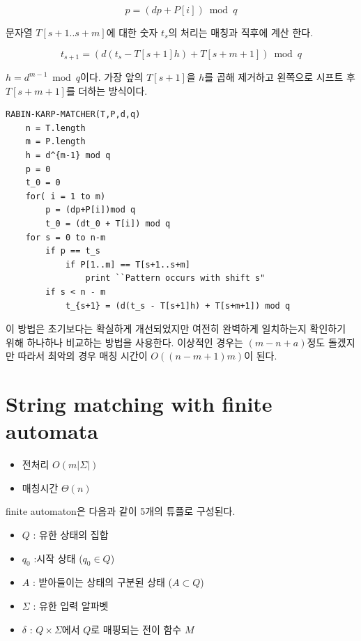 $$p = (dp+P[i]) \bmod q$$

문자열 $T[s+1..s+m]$에 대한 숫자 $t_s$의 처리는 매칭과 직후에 계산 한다.

$$t_{s+1} = (d(t_s - T[s+1]h) + T[s+m+1]) \bmod q$$

$ h = d^{m-1} \bmod q$이다. 가장 앞의 $T[s+1]$을 $h$를 곱해 제거하고 왼쪽으로 시프트 후 $T[s+m+1]$를 더하는 방식이다.



\begin{lstlisting}[style = CStyle]
RABIN-KARP-MATCHER(T,P,d,q)
    n = T.length
    m = P.length
    h = d^{m-1} mod q
    p = 0
    t_0 = 0
    for( i = 1 to m)
        p = (dp+P[i])mod q
        t_0 = (dt_0 + T[i]) mod q
    for s = 0 to n-m
        if p == t_s
            if P[1..m] == T[s+1..s+m]
                print ``Pattern occurs with shift s"
        if s < n - m
            t_{s+1} = (d(t_s - T[s+1]h) + T[s+m+1]) mod q
\end{lstlisting}

이 방법은 초기보다는 확실하게 개선되었지만 여전히 완벽하게 일치하는지 확인하기 위해 하나하나 비교하는 방법을 사용한다. 이상적인 경우는 $(m-n+a)$정도 돌겠지만  따라서 최악의 경우 매칭 시간이 $O((n-m+1)m)$이 된다.

\section{String matching with finite automata}

\begin{itemize}
    \item 전처리 $O(m|\Sigma|)$
    \item 매칭시간 $\Theta(n)$
\end{itemize}

\begin{dfn}[automata]
    finite automaton은 다음과 같이 5개의 튜플로 구성된다.
    \begin{itemize}
        \item $Q$ : 유한 상태의 집합
        \item $q_0$ :시작 상태 ($q_0 \in Q$)
        \item $A$ : 받아들이는 상태의 구분된 상태 ($A \subset Q$)
        \item $\Sigma$ : 유한 입력 알파벳
        \item $\delta$ : $Q \times \Sigma$에서 $Q$로 매핑되는 전이 함수 $M$    \end{itemize}
\end{dfn}

